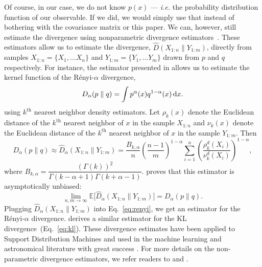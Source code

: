 \documentclass[12pt, letterpaper, preprint]{aastex6}
\newcommand{\beq}{\begin{equation}}
\newcommand{\eeq}{\end{equation}}
\begin{document}
Of course, in our case, we do not know $p(x)$ --- \emph{i.e.} the probability 
distribution function of our observable. If we did, we would simply use that 
instead of bothering with the covariance matrix or this paper. We can, however, 
still estimate the divergence using nonparametric divergence estimators~\citep{wang2009, poczos2012, krishnamurthy2014}. 
These estimators allow us to estimate the divergence, $\widehat{D}(X_{1:n} \parallel Y_{1:m})$, directly from 
samples $X_{1:n} = \{ X_1, ... X_n \}$ and $Y_{1:m} = \{ Y_1, ... Y_m \}$ 
drawn from $p$ and $q$ respectively.
For instance, the estimator presented in \cite{poczos2012} allows us to estimate 
the kernel function of the R\'enyi-$\alpha$ divergence,
\beq \label{eq:d_alpha}
D_{\alpha} ( p \parallel q ) = \int p^\alpha(x) q^{1-\alpha}(x)\,{\rm d}x. 
\eeq
using $k^\mathrm{th}$ nearest neighbor density estimators. Let $\rho_k(x)$ 
denote the Euclidean distance of the $k^\mathrm{th}$ nearest neighbor 
of $x$ in the sample $X_{1:n}$ and $\nu_k(x)$ denote the Euclidean distance 
of the $k^\mathrm{th}$ nearest neighbor of $x$ in the sample $Y_{1:m}$. Then 
\beq \label{eq:d_alpha_est}
D_{\alpha}(p \parallel q) \approx \widehat{D}_{\alpha}(X_{1:n} \parallel Y_{1:m}) = \frac{B_{k,\alpha}}{n} \left(\frac{n-1}{m}\right)^{1-\alpha}
\sum\limits_{i=1}^{n} \left(\frac{\rho_k^{d}(X_i)}{\nu_k^{d}(X_i)} \right)^{1-\alpha},
\eeq
where $B_{k, \alpha} = \dfrac{(\Gamma(k))^2}{\Gamma(k-\alpha+1)\Gamma(k+\alpha-1)}$. 
\cite{poczos2012} proves that this estimator is asymptotically unbiased: 
\beq
\lim_{n, m \rightarrow \infty} \mathbb{E} \big[ \widehat{D}_{\alpha} (X_{1:n} \parallel Y_{1:m}) \big] = D_{\alpha} (p \parallel q).
\eeq
Plugging $\widehat{D}_{\alpha}(X_{1:n} \parallel Y_{1:m})$ into Eq.~\ref{eq:renyi},
we get an estimator for the R\'enyi-$\alpha$ divergence. \cite{wang2009} derives
a similar estimator for the KL divergence~(Eq.~\ref{eq:kl}). 
These divergence estimates have been applied to Support Distribution Machines 
and used in the machine learning and astronomical literature with great success
\citep[\emph{e.g.}][]{poczos2011, poczos2012, poczos2012a, xu2013, ntampaka2015, ntampaka2016, ravanbakhsh2017a}. %
For more details on the non-parametric divergence estimators, we refer readers to 
\cite{poczos2012} and \cite{krishnamurthy2014}.
\end{document}
